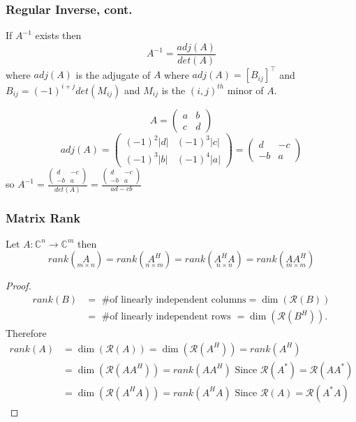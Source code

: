 \documentclass{beamer}
\begin{document}
\begin{frame}\frametitle{Regular Inverse, cont.}
	If $A^{-1}$ exists then 
	\[
	\boxed{A^{-1} = \frac{adj(A)}{det(A)}}
	\]
	where $adj(A)$ is the adjugate of $A$ where $adj(A) = [B_{ij}]^\top$ and $B_{ij} = (-1)^{i+j}det(M_{ij})$ and $M_{ij}$ is the $(i,j)^{th}$ minor of $A$.

	\begin{example}	
		\[ A = 
			\left( 
  			\begin{array}{cc}
    			a & b\\
    			c & d
  			\end{array}
			\right) 
		\]
		\[ adj(A) = 
			\left( 
  			\begin{array}{cc}
    			(-1)^2|d| & (-1)^3|c|\\
    			(-1)^3|b| & (-1)^4|a|
  			\end{array}
			\right)
		= 
			\left(
  			\begin{array}{cc}
    			d & -c\\
    			-b & a
  			\end{array}
			\right)
		\]
		so
			$A^{-1} = \frac{
			\left( \begin{array}{cc}
			d & -c\\
			-b & a
			\end{array}
			\right)
			}
			{det(A)}
			= \frac{
			\left( \begin{array}{cc}
			d & -c\\
			-b & a
			\end{array} \right)
			}
			{ad - cb}$
	\end{example}
\end{frame}

\begin{frame}\frametitle{Matrix Rank}
	\begin{lemma}
		Let $A:\mathbb{C}  ^n \to \mathbb{C}^m$ then
		\[ rank(\underset{m\times n}{A}) = rank(\underset{n \times m}{A^H}) = rank(\underset{n\times n}{A^HA}) = rank(\underset{m\times m}{AA^H}) \]
	\end{lemma}
	
	\begin{proof}
		\begin{align*}
		rank(B) &= \text{ \# of linearly independent columns}
				= \dim(\mathcal{R}(B))\\
				&= \text{ \# of linearly independent rows }
				= \dim(\mathcal{R}(B^H)).
		\end{align*}
		Therefore 
		\begin{align*}
		rank(A) &= \dim(\mathcal{R}(A))
				= \dim(\mathcal{R}(A^H)) = rank(A^H)\\
				&= \dim(\mathcal{R}(AA^H)) =rank(AA^H) \text{ Since $\mathcal{R}(A^\ast) = \mathcal{R}(AA^\ast)$} \\
				&= \dim(\mathcal{R}(A^HA)) = rank(A^HA) \text{ Since $\mathcal{R}(A) = \mathcal{R}(A^\ast A)$}
		\end{align*}
	\end{proof}
\end{frame}
\end{document}
